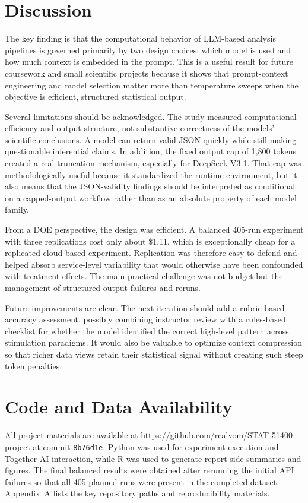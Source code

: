 \documentclass{article}
\begin{document}
\section{Discussion}

The key finding is that the computational behavior of LLM-based analysis pipelines is governed primarily by two design choices: which model is used and how much context is embedded in the prompt. This is a useful result for future coursework and small scientific projects because it shows that prompt-context engineering and model selection matter more than temperature sweeps when the objective is efficient, structured statistical output.

Several limitations should be acknowledged. The study measured computational efficiency and output structure, not substantive correctness of the models' scientific conclusions. A model can return valid JSON quickly while still making questionable inferential claims. In addition, the fixed output cap of 1{,}800 tokens created a real truncation mechanism, especially for DeepSeek-V3.1. That cap was methodologically useful because it standardized the runtime environment, but it also means that the JSON-validity findings should be interpreted as conditional on a capped-output workflow rather than as an absolute property of each model family.

From a DOE perspective, the design was efficient. A balanced 405-run experiment with three replications cost only about \$1.11, which is exceptionally cheap for a replicated cloud-based experiment. Replication was therefore easy to defend and helped absorb service-level variability that would otherwise have been confounded with treatment effects. The main practical challenge was not budget but the management of structured-output failures and reruns.

Future improvements are clear. The next iteration should add a rubric-based accuracy assessment, possibly combining instructor review with a rules-based checklist for whether the model identified the correct high-level pattern across stimulation paradigms. It would also be valuable to optimize context compression so that richer data views retain their statistical signal without creating such steep token penalties.

\section{Code and Data Availability}

All project materials are available at \href{https://github.com/rcalvom/STAT-51400-project}{https://github.com/rcalvom/STAT-51400-project} at commit \texttt{8b76d1e}. Python was used for experiment execution and Together AI interaction, while R was used to generate report-side summaries and figures. The final balanced results were obtained after rerunning the initial API failures so that all 405 planned runs were present in the completed dataset. Appendix~A lists the key repository paths and reproducibility materials.
\end{document}
